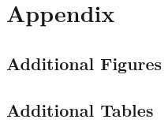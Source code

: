 \section{Appendix}




\clearpage
\subsection{Additional Figures}






\clearpage




\clearpage
\subsection{Additional Tables}

